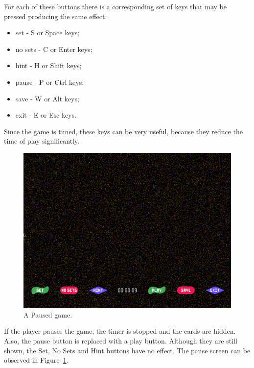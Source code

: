\documentclass[11pt,a4paper,reqno]{report}
\numberwithin{equation}{section}
\begin{document}
For each of these buttons there is a corresponding set of keys that may be pressed producing the same effect:
\begin{itemize}
\item set - S or Space keys;
\item no sets - C or Enter keys;
\item hint - H or Shift keys;
\item pause - P or Ctrl keys;
\item save - W or Alt keys;
\item exit - E or Esc keys.
\end{itemize}
Since the game is timed, these keys can be very useful, because they reduce the time of play significantly.

\begin{figure}[htbp]
\begin{center}
\includegraphics[scale=0.3]{game_pause.png}
\caption{A Paused game.}
\label{game_pause}
\end{center}
\end{figure}

If the player pauses the game, the timer is stopped and the cards are hidden. Also, the pause button is replaced with a play button. Although they are still shown, the Set, No Sets and Hint buttons have no effect. The pause screen can be observed in Figure~\ref{game_pause}.
\end{document}
